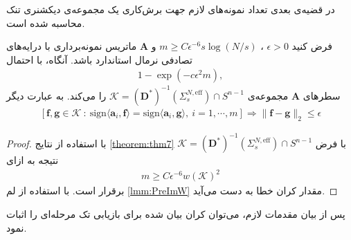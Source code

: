در قضیه‌ی بعدی تعداد نمونه‌های لازم جهت برش‌کاری یک مجموعه‌ی دیکشنری تنک محاسبه شده است.

\begin{theorem}
\label{thm:D-TES}
فرض کنید 
$\epsilon>0$
، 
$m\geq C\epsilon^{-6} s \log\left(N/s\right)$
و 
$\bm{A}$
ماتریس نمونه‌برداری با درایه‌های تصادفی نرمال استاندارد باشد. آنگاه، با احتمال 
\begin{align}
1- \exp(-c\epsilon^{2}m),
\end{align}
 سطرهای 
$\bm{A}$
مجموعه‌ی
$\mathcal{K} = \left(\bm{D}^{\ast}\right)^{-1}\left( \Sigma_{s}^{N,\text{eff}} \right)\cap S^{n-1}$
را 
می‌کند. به عبارت دیگر
\begin{align*}
\label{eq:D-TES1}
\left[ \bm{f},\bm{g}\in \mathcal{K} ~:~	\text{sign}\langle\mathbf{a}_{i},\mathbf{f}\rangle = \text{sign}\langle\mathbf{a}_{i},\mathbf{g}\rangle ,~ i=1,\cdots ,m\right] 
 \Rightarrow \|\mathbf{f}-\mathbf{g}\|_{2}\leq \epsilon 
\end{align*}
\end{theorem}
\begin{proof}
با استفاده از نتایج 
\ref{theorem:thm7}
با فرض
$\mathcal{K} = \left(\bm{D}^{\ast}\right)^{-1}\left( \Sigma_{s}^{N,\text{eff}} \right)\cap S^{n-1}$
نتیجه به ازای 
\begin{align}
m\geq C \epsilon^{-6} w(\mathcal{K})^{2}
\end{align}
برقرار است.
با استفاده از لم
\ref{lmm:PreImW}
مقدار کران خطا به دست می‌آید.
\end{proof}

پس از بیان مقدمات لازم، می‌توان کران بیان شده برای بازیابی تک مرحله‌ای را اثبات نمود.

